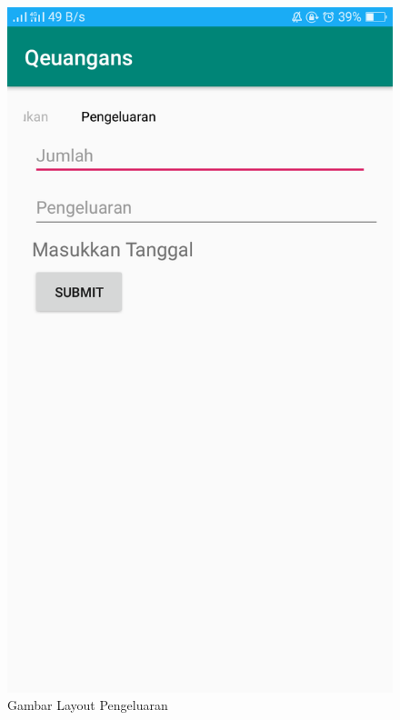 \begin{figure}
    \centering
    \includegraphics[scale = 0.3]{pictures/pengeluaran_layout.png}
    \caption{Gambar Layout Pengeluaran}
\end{figure}


